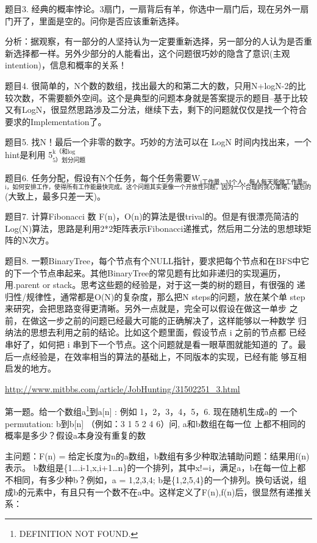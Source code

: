 \documentclass[12pt]{book}
\begin{document}
题目3. 经典的概率悖论。3扇门，一扇背后有羊，你选中一扇门后，现在另外一扇门开了，里面是空的。问你是否应该重新选择。

分析：据观察，有一部分的人坚持认为一定要重新选择，另一部分的人认为是否重新选择都一样。另外少部分的人能看出，这个问题很巧妙的隐含了意识(主观intention)，信息和概率的关系！

题目4. 很简单的，N个数的数组，找出最大的和第二大的数，只用N+logN-2的比较次数，不需要额外空间。这个是典型的问题本身就是答案提示的题目--基于比较又有LogN，很显然思路涉及二分法，继续下去，剩下的问题就仅仅是找一个符合要求的Implementation了。

题目5. 找N！最后一个非零的数字。巧妙的方法可以在 LogN 时间内找出来，一个hint是利用 5$^{\text{k（和log}}_{\text{5）划分问题}}$

题目6. 任务分配，假设有N个任务，每个任务需要W$_{\text{i工作量，M个人，每人每天能做工作量w}}$$_{\text{i，如何安排工作，使得所有工作能最快完成。这个问题其实更像一个开放性问题，因为一个合理的贪心策略，最后的结果跟最优结是很接近的}}$(大致上，最多只差一天)。

题目7. 计算Fibonacci 数 F(n)，O(n)的算法是很trival的。但是有很漂亮简洁的Log(N)算法，思路是利用2*2矩阵表示Fibonacci递推式，然后用二分法的思想球矩阵的N次方。

题目8. 一颗BinaryTree，每个节点有个NULL指针，要求把每个节点和在BFS中它
的下一个节点串起来。其他BinaryTree的常见题有比如非递归的实现遍历，
用.parent or stack。思考这些题的经验是，对于这一类的树的题目，有很强的
递归性/规律性，通常都是O(N)的复杂度，那么把N steps的问题，放在某个单
step来研究，会把思路变得更清晰。另外一点就是，完全可以假设在做这一单步
之前，在做这一步之前的问题已经最大可能的正确解决了，这样能够以一种数学
归纳法的思想去利用之前的结论。比如这个题里面，假设节点 i 之前的节点都
已经串好了，如何把 i 串到下一个节点。这个问题就是看一眼草图就能知道的
了。最后一点经验是，在效率相当的算法的基础上，不同版本的实现，已经有能
够互相启发的地方。

\url{http://www.mitbbs.com/article/JobHunting/31502251_3.html}

第一题。给一个数组a\footnote{DEFINITION NOT FOUND.}到a[n] : 例如 1，2，3，4，5，6. 现在随机生成a的
一个permutation: b\footnotemark[2]{}到b[n] （例如：3 1 5 2 4 6）问, a和b数组在每一位
上都不相同的概率是多少？假设a本身没有重复的数 

主问题：F(n) = 给定长度为n的a数组，b数组有多少种取法辅助问题：结果用f(n)表示。 b数组是\{1….i-1,x,i+1…n\}的一个排列，其中x!=i，满足a，b在每一位上都不相同，有多少种b？例如，a = 1,2,3,4; b是\{1,2,5,4\}的一个排列。换句话说，组成b的元素中，有且只有一个数不在a中。这样定义了F(n),f(n)后，很显然有递推关系：
\end{document}
